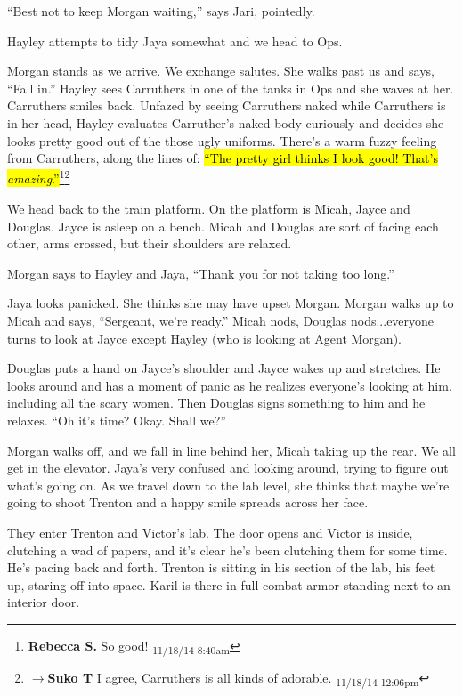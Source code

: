 ``Best not to keep Morgan waiting,'' says Jari, pointedly.

Hayley attempts to tidy Jaya somewhat and we head to Ops.



Morgan stands as we arrive.  We exchange salutes.  She walks past us and says, ``Fall in.''  Hayley sees Carruthers in one of the tanks in Ops and she waves at her.  Carruthers smiles back.  Unfazed by seeing Carruthers naked while Carruthers is in her head, Hayley evaluates Carruther's naked body curiously and decides she looks pretty good out of the those ugly uniforms. There's a warm fuzzy feeling from Carruthers, along the lines of: \hl{``The pretty girl thinks I look good!  That's \textit{amazing}.''}\footnote{\textbf{Rebecca S. }So good! \textsubscript{11/18/14 8:40am}}\footnote{$\rightarrow$\textbf{Suko T }I agree, Carruthers is all kinds of adorable. \textsubscript{11/18/14 12:06pm}}



We head back to the train platform.  On the platform is Micah, Jayce and Douglas. Jayce is asleep on a bench.  Micah and Douglas are sort of facing each other, arms crossed, but their shoulders are relaxed.



Morgan says to Hayley and Jaya, ``Thank you for not taking too long.''

Jaya looks panicked.  She thinks she may have upset Morgan.  Morgan walks up to Micah and says, ``Sergeant, we're ready.''  Micah nods, Douglas nods...everyone turns to look at Jayce except Hayley (who is looking at Agent Morgan).



Douglas puts a hand on Jayce's shoulder and Jayce wakes up and stretches.  He looks around and has a moment of panic as he realizes everyone's looking at him, including all the scary women.  Then Douglas signs something to him and he relaxes.  ``Oh it's time?  Okay.  Shall we?''



Morgan walks off, and we fall in line behind her, Micah taking up the rear.  We all get in the elevator.  Jaya's very confused and looking around, trying to figure out what's going on.  As we travel down to the lab level, she thinks that maybe we're going to shoot Trenton and a happy smile spreads across her face.



They enter Trenton and Victor's lab.  The door opens and Victor is inside, clutching a wad of papers, and it's clear he's been clutching them for some time.  He's pacing back and forth.  Trenton is sitting in his section of the lab, his feet up, staring off into space.  Karil is there in full combat armor standing next to an interior door.



